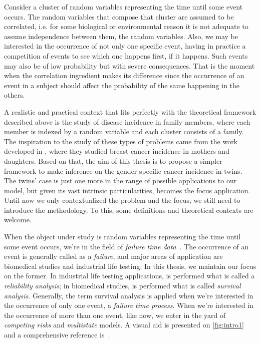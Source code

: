 Consider a cluster of random variables representing the time until some
event occurs. The random variables that compose that cluster are assumed
to be correlated, i.e. for some biological or environmental reason it is
not adequate to assume independence between them, the random variables.
Also, we may be interested in the occurrence of not only one specific
event, having in practice a competition of events to see which one
happens first, if it happens. Such events may also be of low probability
but with severe consequences. That is the moment when the correlation
ingredient makes its difference since the occurrence of an event in a
subject should affect the probability of the same happening in the
others.

A realistic and practical context that fits perfectly with the
theoretical framework described above is the study of disease incidence
in family members, where each member is indexed by a random variable and
each cluster consists of a family. The inspiration to the study of these
types of problems came from the work developed in ,
where they studied breast cancer incidence in mothers and daughters.
Based on that, the aim of this thesis is to propose a simpler framework
to make inference on the gender-specific cancer incidence in twins. The
twins' case is just one more in the range of possible applications to
our model, but given its vast intrinsic particularities, becomes the
focus application. Until now we only contextualized the problem and the
focus, we still need to introduce the methodology. To this, some
definitions and theoretical contexts are welcome.

When the object under study is random variables representing the time
until some event occurs, we're in the field of \textit{failure time
  data}~\cite{kalb&prentice}. The occurrence of an event is generally
called as a \textit{failure}, and major areas of application are
biomedical studies and industrial life testing. In this thesis, we
maintain our focus on the former. In industrial life testing
applications, is performed what is called a \textit{reliability
  analysis}; in biomedical studies, is performed what is called
\textit{survival analysis}. Generally, the term survival analysis is
applied when we're interested in the occurrence of only one event, a
\textit{failure time process}. When we're interested in the occurrence
of more than one event, like now, we enter in the yard of
\textit{competing risks} and \textit{multistate} models. A visual aid is
presented on \autoref{fig:intro1} and a comprehensive reference
is~.

